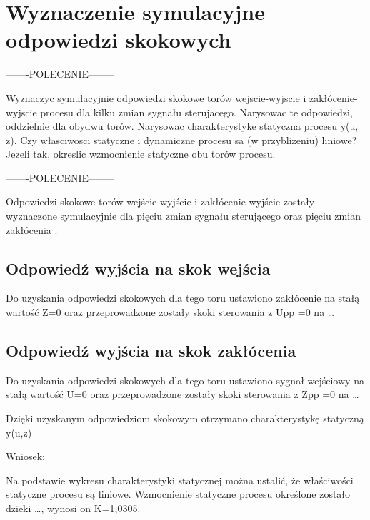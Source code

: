 \section{Wyznaczenie symulacyjne odpowiedzi skokowych}
\label{projekt:zad2}

-------POLECENIE--------

Wyznaczyc symulacyjnie odpowiedzi skokowe torów wejscie-wyjscie i zakłócenie-wyjscie
procesu dla kilku zmian sygnału sterujacego. Narysowac te odpowiedzi, oddzielnie dla
obydwu torów. Narysowac charakterystyke statyczna procesu y(u, z). Czy własciwosci
statyczne i dynamiczne procesu sa (w przyblizeniu) liniowe? Jezeli tak, okreslic
wzmocnienie statyczne obu torów procesu.

-------POLECENIE--------


Odpowiedzi skokowe torów wejście-wyjście i zakłócenie-wyjście zostały wyznaczone
symulacyjnie dla pięciu zmian sygnału sterującego oraz pięciu zmian zakłócenia .

\subsection{Odpowiedź wyjścia na skok wejścia}

Do uzyskania odpowiedzi skokowych dla tego toru ustawiono zakłócenie na stałą
wartość Z=0 oraz przeprowadzone zostały skoki sterowania z Upp =0 na …

\subsection{Odpowiedź wyjścia na skok zakłócenia}

Do uzyskania odpowiedzi skokowych dla tego toru ustawiono sygnał wejściowy na stałą
wartość U=0 oraz przeprowadzone zostały skoki sterowania z Zpp =0 na …

Dzięki uzyskanym odpowiedziom skokowym otrzymano charakterystykę statyczną y(u,z)

Wniosek: 

Na podstawie wykresu charakterystyki statycznej można ustalić, że właściwości
statyczne procesu są liniowe. Wzmocnienie statyczne procesu określone zostało dzieki …,
wynosi on K=1,0305.
